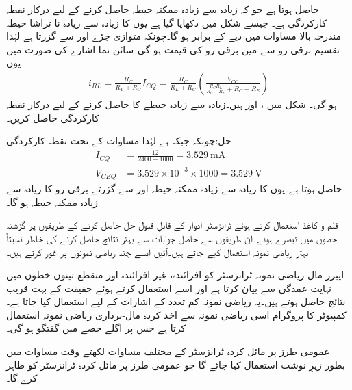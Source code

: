 حاصل ہوتا ہے جو کہ زیادہ سے زیادہ ممکنہ حیطہ حاصل کرنے کے لیے درکار نقطہ کارکردگی ہے۔ جیسے شکل  میں دکھایا گیا ہے یوں  کا زیادہ سے زیادہ نا تراشا حیطہ مندرجہ بالا مساوات میں دیے  کے برابر ہو گا۔چونکہ  متوازی جڑے  اور  سے گزرتا ہے لہٰذا تقسیم برقی رو سے  میں برقی رو  کی قیمت   ہو گی۔سائن نما اشارے کی صورت میں یوں
\begin{align}
i_{RL}=\frac{R_C}{R_L+R_C} I_{CQ} =\frac{R_C}{R_L+R_C}\left(\frac{V_{CC}}{\frac{R_C  R_L}{R_C + R_L}+R_C+R_E}\right)
\end{align}
ہو گی۔
شکل  میں ،  اور  ہیں۔زیادہ سے زیادہ حیطے کا   حاصل کرنے کے لیے درکار نقطہ کارکردگی حاصل کریں۔

حل:چونکہ  جبکہ  ہے لہٰذا مساوات  کے تحت نقطہ کارکردگی
\begin{align*}
I_{CQ}&=\frac{12}{2400+1000}=\SI{3.529}{\milli \ampere}\\
V_{CEQ}&=3.529 \times 10^{-3} \times 1000=\SI{3.529}{\volt}
\end{align*} 
حاصل ہوتا ہے۔یوں   کا زیادہ سے زیادہ ممکنہ حیطہ   اور  سے گزرتے برقی رو  کا زیادہ سے زیادہ ممکنہ حیطہ  ہو گا۔

قلم و کاغذ استعمال کرتے ہوئے ٹرانزسٹر ادوار کے قابلِ قبول حل حاصل کرنے کے طریقوں پر گزشتہ حصوں میں تبصرے ہوئے۔ان طریقوں سے حاصل جوابات سے بہتر نتائج حاصل کرنے کی خاطر نسبتاً بہتر ریاضی نمونہ  استعمال کیے جاتے ہیں۔آئیں ایسے چند ریاضی نمونوں پر غور کرتے ہیں۔

ایبرز-مال ریاضی نمونہ   ٹرانزسٹر کو افزائندہ، غیر افزائندہ اور منقطع تینوں خطوں میں نہایت عمدگی سے بیان کرتا ہے اور اسے استعمال کرتے ہوئے حقیقت کے بہت قریب نتائج حاصل ہوتے ہیں۔یہ ریاضی نمونہ  کم تعدد کے اشارات کے لیے استعمال کیا جاتا ہے۔کمپیوٹر کا پروگرام   اسی ریاضی نمونہ  سے اخذ کردہ مال-برداری ریاضی نمونہ   استعمال کرتا ہے جس پر اگلے حصے میں گفتگو ہو گی۔

عمومی طرز پر مائل کردہ  ٹرانزسٹر کے مختلف مساوات لکھتے وقت مساوات میں  بطور زیرِ نوشت استعمال کیا جائے گا جو عمومی طرز پر مائل کردہ ٹرانزسٹر کو ظاہر کرے گا۔

